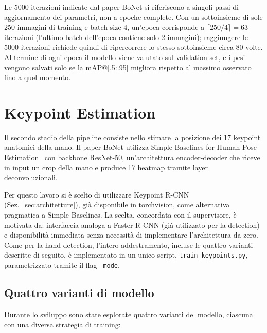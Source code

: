 Le 5000 iterazioni indicate dal paper BoNet si riferiscono a singoli
passi di aggiornamento dei parametri, non a epoche complete. Con un
sottoinsieme di sole 250 immagini di training e batch size 4, un'epoca
corrisponde a $\lceil 250/4 \rceil = 63$ iterazioni (l'ultimo batch
dell'epoca contiene solo 2 immagini); raggiungere le 5000 iterazioni
richiede quindi di ripercorrere lo stesso sottoinsieme circa 80 volte.
Al termine di ogni epoca il modello viene valutato sul validation set, e
i pesi vengono salvati solo se la mAP@[.5:.95] migliora rispetto al
massimo osservato fino a quel momento.

\section{Keypoint Estimation}
\label{sec:keypoint_estimation}

Il secondo stadio della pipeline consiste nello stimare la posizione dei 17
keypoint anatomici della mano. Il paper BoNet utilizza Simple Baselines for
Human Pose Estimation~\cite{xiao2018simplebaselines} con backbone
ResNet-50, un'architettura encoder-decoder che riceve in input un crop
della mano e produce 17 heatmap tramite layer deconvoluzionali.

Per questo lavoro si è scelto di utilizzare Keypoint
R-CNN~\cite{he2017maskrcnn} (Sez.~\ref{sec:architetture}), già
disponibile in torchvision, come alternativa pragmatica a Simple
Baselines. La scelta, concordata con il supervisore, è motivata da:
interfaccia analoga a Faster R-CNN (già utilizzato per la detection) e
disponibilità immediata senza necessità di implementare l'architettura
da zero. Come per la hand detection, l'intero addestramento, incluse le
quattro varianti descritte di seguito, è implementato in un unico
script, \texttt{train\_keypoints.py}, parametrizzato tramite il flag
\texttt{--mode}.

\subsection{Quattro varianti di modello}
\label{sec:varianti_modello}

Durante lo sviluppo sono state esplorate quattro varianti del modello,
ciascuna con una diversa strategia di training:

